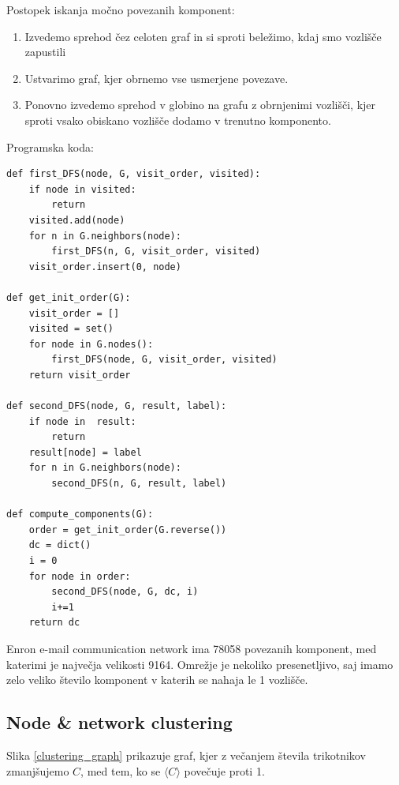 \documentclass[a4paper,11pt]{article}
\begin{document}
Postopek iskanja močno povezanih komponent:
\begin{enumerate}

\item Izvedemo sprehod čez celoten graf in si sproti beležimo, kdaj smo vozlišče zapustili
\item Ustvarimo graf, kjer obrnemo vse usmerjene povezave.
\item Ponovno izvedemo sprehod v globino na grafu z obrnjenimi vozlišči, kjer sproti vsako obiskano vozlišče dodamo v trenutno komponento.
\end{enumerate}

Programska koda:
\begin{lstlisting}
def first_DFS(node, G, visit_order, visited):
    if node in visited:
        return
    visited.add(node)
    for n in G.neighbors(node):
        first_DFS(n, G, visit_order, visited)
    visit_order.insert(0, node)

def get_init_order(G):
    visit_order = []
    visited = set()
    for node in G.nodes():
        first_DFS(node, G, visit_order, visited)
    return visit_order

def second_DFS(node, G, result, label):
    if node in  result:
        return
    result[node] = label
    for n in G.neighbors(node):
        second_DFS(n, G, result, label)

def compute_components(G):
    order = get_init_order(G.reverse())
    dc = dict()
    i = 0
    for node in order:
        second_DFS(node, G, dc, i)
        i+=1
    return dc
\end{lstlisting}

Enron e-mail communication network ima 78058 povezanih komponent, med katerimi je največja velikosti 9164. Omrežje je nekoliko presenetljivo, saj imamo zelo veliko število komponent v katerih se nahaja le 1 vozlišče.

\subsection{Node \& network clustering}

Slika \ref{clustering_graph} prikazuje graf, kjer z večanjem števila trikotnikov zmanjšujemo $C$, med tem, ko se $\langle C \rangle$ povečuje proti 1.
\end{document}
